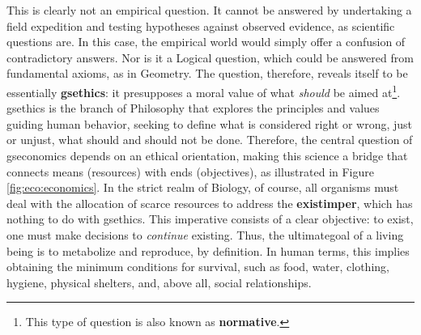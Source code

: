 \documentclass[./main_en.tex]{subfiles}
\begin{document}
\noindent This is clearly not an empirical question. It cannot be answered by undertaking a field expedition and testing hypotheses against observed evidence, as scientific questions are. In this case, the empirical world would simply offer a confusion of contradictory answers. Nor is it a Logical question, which could be answered from fundamental axioms, as in Geometry. The question, therefore, reveals itself to be essentially \textbf{\gls{gsethics}}: it presupposes a moral value of what \textit{should} be aimed at\footnote{This type of question is also known as \textbf{normative}.}. \gls{gsethics} is the branch of Philosophy that explores the principles and values guiding human behavior, seeking to define what is considered right or wrong, just or unjust, what should and should not be done. Therefore, the central question of \gls{gseconomics} depends on an ethical orientation, making this science a bridge that connects means (resources) with ends (objectives), as illustrated in Figure \ref{fig:eco:economics}. In the strict realm of Biology, of course, all organisms must deal with the allocation of scarce resources to address the \textbf{\gls{existimper}}, which has nothing to do with \gls{gsethics}. This imperative consists of a clear objective: to exist, one must make decisions to \textit{continue} existing. Thus, the \gls{ultimategoal} of a living being is to metabolize and reproduce, by definition. In human terms, this implies obtaining the minimum conditions for survival, such as food, water, clothing, hygiene, physical shelters, and, above all, social relationships.
\end{document}
